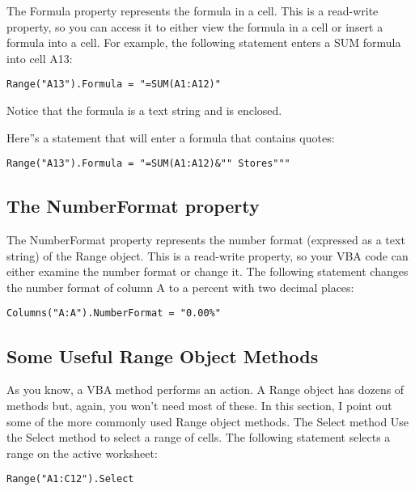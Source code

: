 \documentclass[
]{article}
\theoremstyle{definition}
\theoremstyle{definition}
\theoremstyle{definition}
\theoremstyle{definition}
\theoremstyle{remark}
\begin{document}
The Formula property represents the formula in a cell. This is a
read-write property, so you can access it to either view the formula in
a cell or insert a formula into a cell. For example, the following
statement enters a SUM formula into cell A13:

\begin{verbatim}
Range("A13").Formula = "=SUM(A1:A12)"
\end{verbatim}

Notice that the formula is a text string and is enclosed.

Here''s a statement that will enter a formula that contains quotes:

\begin{verbatim}
Range("A13").Formula = "=SUM(A1:A12)&"" Stores"""
\end{verbatim}

\hypertarget{the-numberformat-property}{%
\subsection{The NumberFormat property}\label{the-numberformat-property}}

The NumberFormat property represents the number format (expressed as a text string) of the Range object. This is a read-write property, so your
VBA code can either examine the number format or change it. The following statement changes the number format of column A to a percent with two decimal places:

\begin{verbatim}
Columns("A:A").NumberFormat = "0.00%"
\end{verbatim}

\hypertarget{some-useful-range-object-methods}{%
\subsection{Some Useful Range Object Methods}\label{some-useful-range-object-methods}}

As you know, a VBA method performs an action. A Range object has dozens of methods but, again, you won't need most of these. In this section,
I point out some of the more commonly used Range object methods. The
Select method Use the Select method to select a range of cells. The
following statement selects a range on the active worksheet:

\begin{verbatim}
Range("A1:C12").Select
\end{verbatim}
\end{document}
